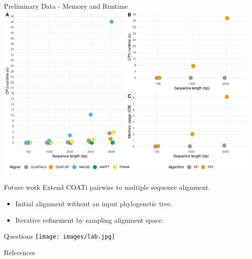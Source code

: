 \documentclass{beamer}
\begin{document}
\begin{frame}{Preliminary Data - Memory and Runtime} %
\includegraphics[scale=0.45,center]{fig-benchmark.pdf}
\end{frame} %

\begin{frame}{Future work} %
Extend COATi pairwise to multiple sequence alignment.
\vspace{1em}
\begin{itemize}
	\setlength\itemsep{1em}
	\item Initial alignment without an input phylogenetic tree.
	\item Iterative refinement by sampling alignment space.
\end{itemize}
\end{frame} %

\begin{frame}{Questions} %
\texttt{[image: images/lab.jpg]}
\end{frame} %

\appendix %

\begin{frame}[t,allowframebreaks]{References} %
\printbibliography
\end{frame} %
\end{document}
